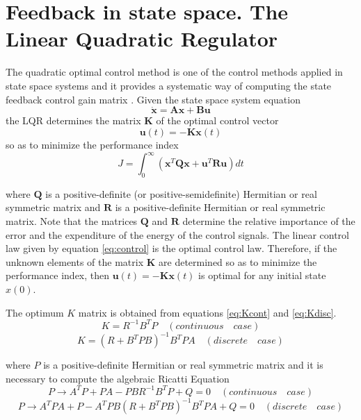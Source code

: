 \section{Feedback in state space. The Linear Quadratic Regulator}

The quadratic optimal control method is one of the control methods applied in state space systems and it provides a systematic way of computing the state feedback control gain matrix \cite{Ogata}.
Given the state space system equation
\begin{equation}
\mathbf{\dot{x}} = \mathbf{A}\textbf{x} + \mathbf{B}\mathbf{u}
\end{equation}
the LQR determines the matrix $\mathbf{K}$ of the optimal control vector
\begin{equation}
\mathbf{u}(t) = -\mathbf{Kx}(t)
\label{eq:control}
\end{equation}
so as to minimize the performance index
\begin{equation}
J = \int_{0}^{\infty}(\mathbf{x}^{T}\mathbf{Qx}+\mathbf{u}^{T}\mathbf{Ru}) dt
\end{equation}

where $\mathbf{Q}$ is a positive-definite (or positive-semidefinite) Hermitian or real symmetric matrix and $\mathbf{R}$ is a positive-definite Hermitian or real symmetric matrix. Note that the matrices $\mathbf{Q}$ and $\mathbf{R}$ determine the relative importance of the error and the expenditure of the energy of the control signals.
The linear control law given by equation \eqref{eq:control} is the optimal control law. Therefore, if the unknown elements of the matrix $\mathbf{K}$ are determined so as to minimize the performance index, then $\mathbf{u}(t) = -\mathbf{Kx}(t)$  is optimal for any initial state $x(0)$. 

The optimum $K$ matrix is obtained from equations \ref{eq:Kcont} and \ref{eq:Kdisc}.
\begin{equation}
K = R^{-1}B^{T}P \quad (continuous \quad case)
\label{eq:Kcont}
\end{equation}
\begin{equation}
K = (R + B^{T}PB)^{-1}B^{T}PA \quad (discrete \quad case)
\label{eq:Kdisc}
\end{equation}

where $P$ is a positive-definite Hermitian or real symmetric matrix and it is necessary to compute the algebraic Ricatti Equation
\begin{equation}
P \rightarrow A^{T}P+PA-PBR^{-1}B^{T}P+Q = 0 \quad (continuous \quad case)
\end{equation}
\begin{equation}
P \rightarrow A^{T}PA+P-A^{T}PB(R+B^{T}PB)^{-1}B^{T}PA+Q = 0 \quad (discrete \quad case)
\end{equation}


